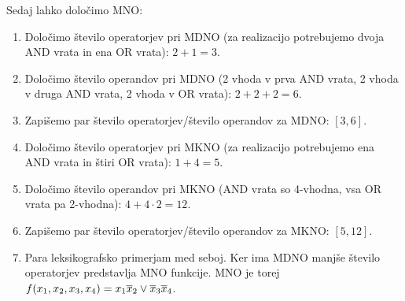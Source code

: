 \begin{resitev}
Sedaj lahko določimo MNO:
\begin{enumerate}
\item Določimo število operatorjev pri MDNO (za realizacijo potrebujemo dvoja AND vrata in ena OR vrata): $2+1=3$.
\item Določimo število operandov pri MDNO (2 vhoda v prva AND vrata, 2 vhoda v druga AND vrata, 2 vhoda v OR vrata): $2+2+2=6$.
\item Zapišemo par število operatorjev/število operandov za MDNO: $[3,6]$.
\item Določimo število operatorjev pri MKNO (za realizacijo potrebujemo ena AND vrata in štiri OR vrata): $1+4=5$.
\item Določimo število operandov pri MKNO (AND vrata so 4-vhodna, vsa OR vrata pa 2-vhodna): $4+4 \cdot 2=12$.
\item Zapišemo par število operatorjev/število operandov za MKNO: $[5,12]$.
\item Para leksikografsko primerjam med seboj. Ker ima MDNO manjše število operatorjev predstavlja MNO funkcije. MNO je torej $f(x_1,x_2,x_3,x_4)=x_1 \overline x_2 \vee \overline x_3 \overline x_4$.
\end{enumerate}
\end{resitev}

